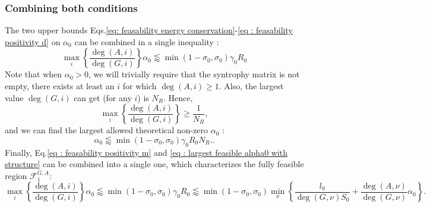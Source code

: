 \documentclass[12pt, titlepage, twoside, openright]{report}
\begin{document}
\subsubsection{Combining both conditions}
The two upper bounds Eqs.\eqref{eq: feasability energy conservation}-\eqref{eq : feasability positivity d} on $\alpha_0$ can be combined in a single inequality :
\begin{equation} \label{eq : largest feasible alpha0 with structure}
\max_i\left\{\frac{\deg(A,i)}{\deg(G,i)}\right\} \alpha_0 \lessapprox \min(1-\sigma_0, \sigma_0) \gamma_0 R_0
\end{equation}
Note that when $\alpha_0 > 0$, we will trivially require that the syntrophy matrix is not empty, \ie there exists at least an $i$ for which $\deg(A,i) \geq 1$. Also, the largest value $\deg(G,i)$ can get (for any $i$) is $N_R$. Hence,
\begin{equation}
\max_i\left\{ \frac{\deg(A,i)}{\deg(G,i)} \right\} \geq \frac{1}{N_R},
\end{equation}
and we can find the largest allowed theoretical non-zero $\alpha_0$ :
\begin{equation}
{
\alpha_0 \lessapprox \min(1-\sigma_0, \sigma_0) \gamma_0 R_0 N_R. \label{eq : largest feasible alpha0}
}.
\end{equation}
Finally, Eq.\eqref{eq : feasability positivity m} and \eqref{eq : largest feasible alpha0 with structure} can be combined into a single one, which characterizes the fully feasible region $\mathcal{F}^{G,A}_1$:
\begin{equation}
{
\max_i\left\{\frac{\deg(A,i)}{\deg(G,i)}\right\} \alpha_0
\lessapprox \min(1-\sigma_0, \sigma_0) \gamma_0 R_0
\lessapprox
\min \left(1-\sigma_0, \sigma_0 \right) \min_\nu \left\{ \frac{l_0}{\deg(G,\nu) S_0} + \frac{\deg(A,\nu)}{\deg(G,\nu)}\alpha_0\right\}
}.
\end{equation}
\end{document}
